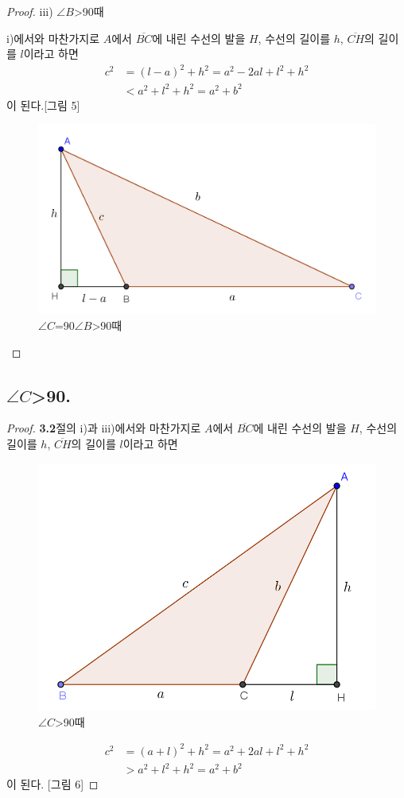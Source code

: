 \documentclass{article}
\newcommand{\C}{\ensuremath{\angle C}}
\newcommand{\bb}{\ensuremath{\angle B}}
\newcommand{\D}{\ensuremath{{}^\circ}}
\newcommand{\PPPP}{\ensuremath{a^2+b^2<c^2}}
\begin{document}
\begin{proof}
iii) \bb>90 때

i)에서와 마찬가지로 \(A\)에서 \(\overline{BC}\)에 내린 수선의 발을 \(H\), 수선의 길이를 \(h\), \(\overline{CH}\)의 길이를 \(l\)이라고 하면
\begin{align*}
c^2
&=(l-a)^2+h^2=a^2-2al+l^2+h^2\\
&<a^2+l^2+h^2=a^2+b^2
\end{align*}
이 된다.[그림 5]
\begin{figure}[h!]
\center
\includegraphics{3_3}
\caption{\C=90 \bb>90 때}
\end{figure}
\end{proof}

\subsection{\C>90 .}
\begin{proof}
\textbf{3.2}절의 i)과 iii)에서와 마찬가지로 \(A\)에서 \(\overline{BC}\)에 내린 수선의 발을 \(H\), 수선의 길이를 \(h\), \(\overline{CH}\)의 길이를 \(l\)이라고 하면
\begin{figure}[h]
\center
\includegraphics{3_4}
\caption{\C>90 때}
\end{figure}
\begin{align*}
c^2
&=(a+l)^2+h^2=a^2+2al+l^2+h^2\\
&>a^2+l^2+h^2=a^2+b^2
\end{align*}
이 된다.
[그림 6]
\end{proof}
\end{document}

